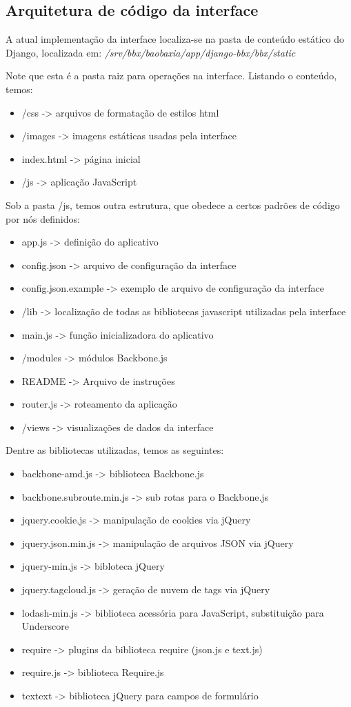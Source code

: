 \subsection{Arquitetura de código da interface}
A atual implementação da interface localiza-se na pasta de conteúdo estático
do Django, localizada em:
\emph{/srv/bbx/baobaxia/app/django-bbx/bbx/static}

Note que esta é a pasta raiz para operações na interface. Listando o conteúdo,
temos:
\begin{itemize}
  \item /css     -> arquivos de formatação de estilos html
  \item /images  -> imagens estáticas usadas pela interface
  \item index.html  -> página inicial
  \item /js      -> aplicação JavaScript
\end{itemize}

Sob a pasta /js, temos outra estrutura, que obedece a certos padrões de código
por nós definidos:
\begin{itemize}
  \item app.js   -> definição do aplicativo
  \item config.json  -> arquivo de configuração da interface
  \item config.json.example  -> exemplo de arquivo de configuração da interface
  \item /lib     -> localização de todas as bibliotecas javascript utilizadas pela interface
  \item main.js  -> função inicializadora do aplicativo
  \item /modules  -> módulos Backbone.js
  \item README    -> Arquivo de instruções
  \item router.js   -> roteamento da aplicação
  \item /views    -> visualizações de dados da interface
\end{itemize}

Dentre as bibliotecas utilizadas, temos as seguintes:
\begin{itemize}
  \item backbone-amd.js   -> biblioteca Backbone.js
  \item backbone.subroute.min.js -> sub rotas para o Backbone.js
  \item jquery.cookie.js  -> manipulação de cookies via jQuery
  \item jquery.json.min.js  -> manipulação de arquivos JSON via jQuery
  \item jquery-min.js     -> bibloteca jQuery
  \item jquery.tagcloud.js   -> geração de nuvem de tags via jQuery
  \item lodash-min.js    -> biblioteca acessória para JavaScript, substituição para Underscore
  \item require    -> plugins da biblioteca require (json.js e text.js)
  \item require.js  -> biblioteca Require.js
  \item textext -> biblioteca jQuery para campos de formulário
\end{itemize}

